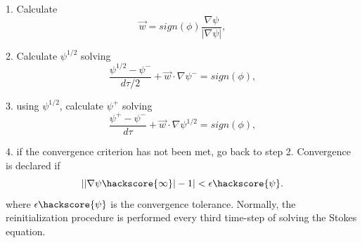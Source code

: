 1. Calculate
%
\begin{equation}
\vec{w} = sign(\phi)\frac{\nabla \psi}{|\nabla \psi|},
\label{REINITIAL MIDPOINT1}
\end{equation}
%

2. Calculate $\psi^{1/2}$ solving
%
\begin{equation}
\frac{\psi^{1/2} - \psi^{-}}{d\tau/2} + \vec{w} \cdot \nabla \psi^{-}= sign(\phi),
\label{REINITIAL MIDPOINT2}
\end{equation}
%

3. using $\psi^{1/2}$, calculate $\psi^{+}$ solving
%
\begin{equation}
\frac{\psi^{+} - \psi^{-}}{d\tau} + \vec{w} \cdot \nabla \psi^{1/2}= sign(\phi),
\label{REINITIAL MIDPOINT3}
\end{equation}
%

4. if the convergence criterion has not been met, go back to step 2. Convergence is declared if
%
\begin{equation}
||\nabla \psi \hackscore{\infty}| - 1| < \epsilon \hackscore{\psi}.
\label{REINITIAL CONVERGE}
\end{equation}
%
where $\epsilon \hackscore{\psi}$ is the convergence tolerance. Normally, the reinitialization procedure is performed every third time-step of solving the Stokes equation.

